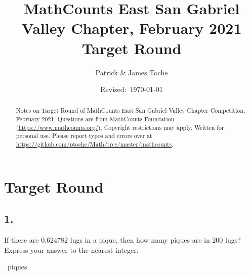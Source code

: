 \documentclass[12pt]{article}
\title{MathCounts East San Gabriel Valley Chapter, February 2021 \\ Target Round}
\author{Patrick \& James Toche}
\date{Revised:~\today}
\begin{document}
\maketitle
\begin{minipage}{\textwidth}
\begin{abstract}\setlength{\parindent}{0pt}%
Notes on Target Round of MathCounts East San Gabriel Valley Chapter Competition, February 2021. 
Questions are from MathCounts Foundation (\url{https://www.mathcounts.org/}). Copyright restrictions may apply. Written for personal use. 
Please report typos and errors over at \url{https://github.com/ptoche/Math/tree/master/mathcounts}. 
\end{abstract}
\end{minipage}

\thispagestyle{empty}
\clearpage
\addtocounter{page}{-1}

\section*{Target Round}


\subsection*{1.}
If there are $0.624782$ lugs in a pique, then how many piques are in $200$ lugs? Express your answer to the nearest integer.

\nopagebreak

\fbox{\phantom{ANSWER}}~piques

\nopagebreak

\begin{answer}
%
\end{answer}
\end{document}
